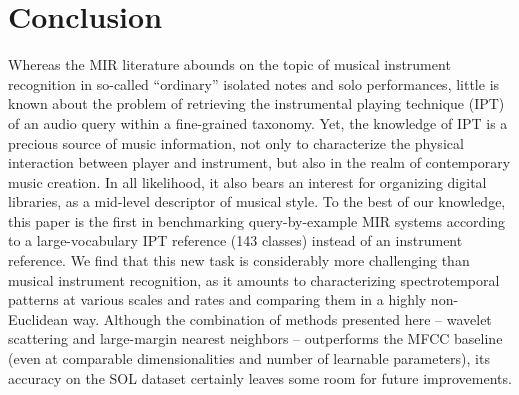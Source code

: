 \documentclass{article}
\begin{document}



\section{Conclusion}

Whereas the MIR literature abounds on the topic of musical instrument recognition in so-called ``ordinary'' isolated notes and solo performances, little is known about the problem of retrieving the instrumental playing technique (IPT) of an audio query within a fine-grained taxonomy.
Yet, the knowledge of IPT is a precious source of music information, not only to characterize the physical interaction between player and instrument, but also in the realm of contemporary music creation.
In all likelihood, it also bears an interest for organizing digital libraries, as a mid-level descriptor of musical style.
To the best of our knowledge, this paper is the first in benchmarking query-by-example MIR systems according to a large-vocabulary IPT reference (143 classes) instead of an instrument reference.
We find that this new task is considerably more challenging than musical instrument recognition, as it amounts to characterizing spectrotemporal patterns at various scales and rates and comparing them in a highly non-Euclidean way.
Although the combination of methods presented here -- wavelet scattering and large-margin nearest neighbors -- outperforms the MFCC baseline (even at comparable dimensionalities and number of learnable parameters), its accuracy on the SOL dataset certainly leaves some room for future improvements.
\end{document}
